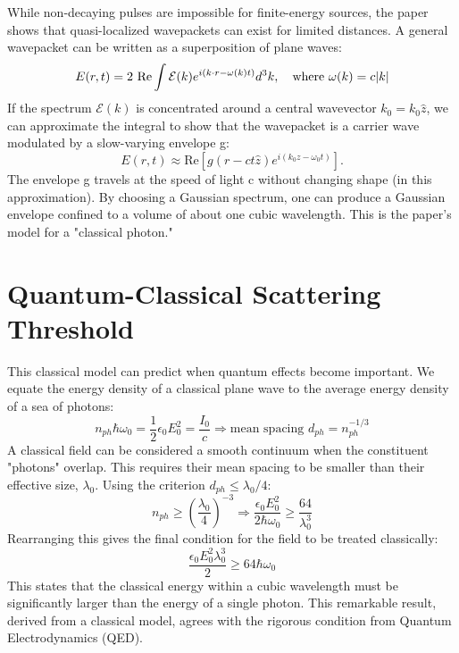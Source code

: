 \documentclass[11pt,a4paper]{article}
\begin{document}
While non-decaying pulses are impossible for finite-energy sources, the paper shows that quasi-localized wavepackets can exist for limited distances. A general wavepacket can be written as a superposition of plane waves:
\begin{equation}
    E(r,t)=2 \text{ Re}\int\mathcal{E}(k)e^{i(k\cdot r-\omega(k)t)}d^{3}k, \quad \text{where } \omega(k)=c\abs{k}
\end{equation}
If the spectrum \(\mathcal{E}(k)\) is concentrated around a central wavevector \(k_{0}=k_{0}\hat{z}\), we can approximate the integral to show that the wavepacket is a carrier wave modulated by a slow-varying envelope g:
\begin{equation}
    E(r,t)\approx \text{Re}[g(r-c t\hat{z})e^{i(k_{0}z-\omega_{0}t)}].
\end{equation}
The envelope g travels at the speed of light c without changing shape (in this approximation). By choosing a Gaussian spectrum, one can produce a Gaussian envelope confined to a volume of about one cubic wavelength. This is the paper's model for a "classical photon."

\section{Quantum-Classical Scattering Threshold}

This classical model can predict when quantum effects become important. We equate the energy density of a classical plane wave to the average energy density of a sea of photons:
\begin{equation}
    n_{ph}\hbar\omega_{0}=\frac{1}{2}\epsilon_{0}E_{0}^{2}=\frac{I_{0}}{c} \Rightarrow \text{mean spacing } d_{ph}=n_{ph}^{-1/3}
\end{equation}
A classical field can be considered a smooth continuum when the constituent "photons" overlap. This requires their mean spacing to be smaller than their effective size, \(\lambda_{0}\). Using the criterion \(d_{ph}\le\lambda_{0}/4\):
\begin{equation}
    n_{ph}\ge\left(\frac{\lambda_{0}}{4}\right)^{-3} \Rightarrow \frac{\epsilon_{0}E_{0}^{2}}{2\hbar\omega_{0}}\ge\frac{64}{\lambda_{0}^{3}}
\end{equation}
Rearranging this gives the final condition for the field to be treated classically:
\begin{equation}
    \frac{\epsilon_{0}E_{0}^{2}\lambda_{0}^{3}}{2}\ge64\hbar\omega_{0}
\end{equation}
This states that the classical energy within a cubic wavelength must be significantly larger than the energy of a single photon. This remarkable result, derived from a classical model, agrees with the rigorous condition from Quantum Electrodynamics (QED).
\end{document}
